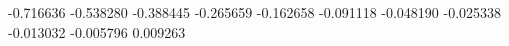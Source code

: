 -0.716636
-0.538280
-0.388445
-0.265659
-0.162658
-0.091118
-0.048190
-0.025338
-0.013032
-0.005796
0.009263
